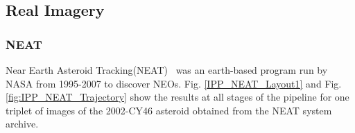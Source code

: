 \subsection{Real Imagery}


\subsubsection{NEAT}
Near Earth Asteroid Tracking(NEAT)~\cite{neat2014} was an earth-based program run by NASA from 1995-2007 to discover NEOs.
Fig. \ref{IPP_NEAT_Layout1} and Fig. \ref{fig:IPP_NEAT_Trajectory} show the results at all stages of the pipeline for one triplet of images of the 2002-CY46 asteroid obtained from the NEAT system archive. 
 
